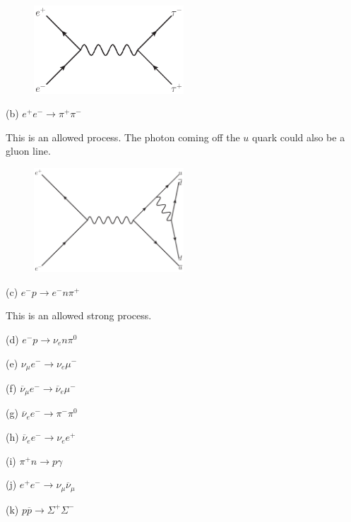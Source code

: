 \begin{figure}[H]
\begin{center}
\includegraphics[width=0.5\textwidth]{prob4/a.eps} 
\end{center} 
\end{figure}

(b) $e^{+}e^{-} \rightarrow \pi^{+}\pi^{-}$

This is an allowed process.
The photon coming off the $u$ quark could also be a gluon line.

\begin{figure}[H]
\begin{center}
\includegraphics[width=0.5\textwidth]{prob4/b.eps} 
\end{center} 
\end{figure}

(c) $e^{-}p \rightarrow e^{-}n\pi^{+}$ 

This is an allowed strong process.

(d) $e^{-}p \rightarrow \nu_{e}n\pi^{0}$

(e) $\nu_{\mu}e^{-} \rightarrow \nu_{e}\mu^{-}$

(f) $\overline{\nu}_{\mu}e^{-} \rightarrow \overline{\nu}_{e}\mu^{-}$

(g) $\overline{\nu}_{e}e^{-} \rightarrow \pi^{-}\pi^{0}$

(h) $\overline{\nu}_{e}e^{-} \rightarrow \nu_{e}e^{+}$ 

(i) $\pi^{+}n \rightarrow p\gamma$

(j) $e^{+}e^{-} \rightarrow \nu_{\mu}\overline{\nu}_{\mu}$

(k) $p\overline{p} \rightarrow \Sigma^{+}\Sigma^{-}$

